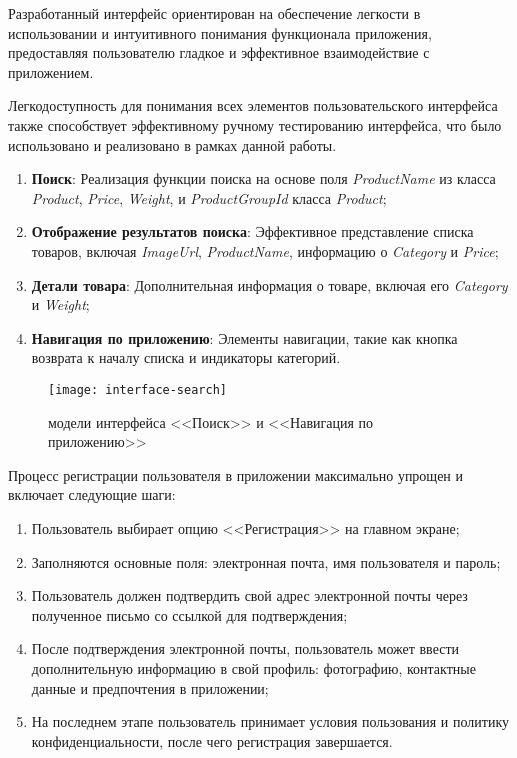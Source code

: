 Разработанный интерфейс ориентирован на обеспечение легкости в использовании и интуитивного понимания функционала приложения, предоставляя пользователю гладкое и эффективное взаимодействие с приложением.

Легкодоступность для понимания всех элементов пользовательского интерфейса также способствует эффективному ручному тестированию интерфейса, что было использовано и реализовано в рамках данной работы.

\begin{enumerate}
    \item \textbf{Поиск}: Реализация функции поиска на основе поля \textit{ProductName} из класса \textit{Product}, \textit{Price}, \textit{Weight}, и \textit{ProductGroupId} класса \textit{Product};
    \item \textbf{Отображение результатов поиска}: Эффективное представление списка товаров, включая \textit{ImageUrl}, \textit{ProductName}, информацию о \textit{Category} и \textit{Price};
    \item \textbf{Детали товара}: Дополнительная информация о товаре, включая его \textit{Category} и \textit{Weight};
    \item \textbf{Навигация по приложению}: Элементы навигации, такие как кнопка возврата к началу списка и индикаторы категорий.
\end{enumerate}

\begin{figure}[h!]
    \texttt{[image: interface-search]}
    \caption{модели интерфейса <<Поиск>> и <<Навигация по приложению>>}
    \label{fig:search}
\end{figure}

Процесс регистрации пользователя в приложении максимально упрощен и включает следующие шаги:
\begin{enumerate}
    \item Пользователь выбирает опцию <<Регистрация>> на главном экране;
    \item Заполняются основные поля: электронная почта, имя пользователя и пароль;
    \item Пользователь должен подтвердить свой адрес электронной почты через полученное письмо со ссылкой для подтверждения;
    \item После подтверждения электронной почты, пользователь может ввести дополнительную информацию в свой профиль: фотографию, контактные данные и предпочтения в приложении;
    \item На последнем этапе пользователь принимает условия пользования и политику конфиденциальности, после чего регистрация завершается.
\end{enumerate}


